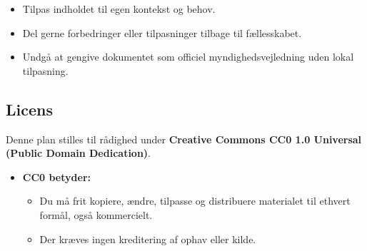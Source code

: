 \documentclass[a4paper,11pt]{book}
\begin{document}
\begin{itemize}
\tightlist
\item
  Tilpas indholdet til egen kontekst og behov.
\item
  Del gerne forbedringer eller tilpasninger tilbage til fællesskabet.
\item
  Undgå at gengive dokumentet som officiel myndighedsvejledning uden
  lokal tilpasning.
\end{itemize}

\subsection{Licens}\label{licens}

Denne plan stilles til rådighed under \textbf{Creative Commons CC0 1.0
Universal (Public Domain Dedication)}.

\begin{itemize}
\item
  \textbf{CC0 betyder:}

  \begin{itemize}
  \tightlist
  \item
    Du må frit kopiere, ændre, tilpasse og distribuere materialet til
    ethvert formål, også kommercielt.
  \item
    Der kræves ingen kreditering af ophav eller kilde.
  \end{itemize}
\end{itemize}
\end{document}
